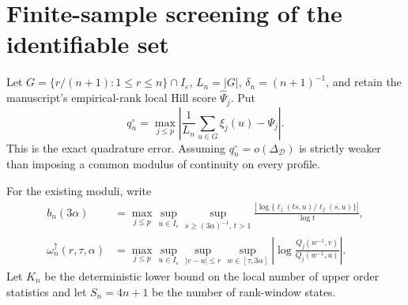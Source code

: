 \documentclass[11pt]{article}
\theoremstyle{definition}\newtheorem{definition}[theorem]{Definition}
\newcommand{\I}{I_\varepsilon}
\newcommand{\D}{\mathcal D}
\begin{document}
\section{Finite-sample screening of the identifiable set}

Let $G=\{r/(n+1):1\le r\le n\}\cap\I$, $L_n=|G|$,
$\delta_n=(n+1)^{-1}$, and retain the manuscript's empirical-rank local Hill
score $\widehat\Psi_j$.  Put
\begin{equation}
 q_n^\circ
 =\max_{j\le p}
 \left|\frac1{L_n}\sum_{u\in G}\xi_j(u)-\Psi_j\right|.
 \label{eq:direct-quadrature}
\end{equation}
This is the exact quadrature error.  Assuming $q_n^\circ=o(\Delta_{\D})$ is
strictly weaker than imposing a common modulus of continuity on every
profile.

For the existing moduli, write
\begin{align*}
 b_n(3\alpha)
 &=\max_{j\le p}\sup_{u\in\I}
   \sup_{s\ge(3\alpha)^{-1},\,t>1}
   \frac{|\log\{\ell_j(ts,u)/\ell_j(s,u)\}|}{\log t},\\
 \omega_n^\uparrow(r,\tau,\alpha)
 &=\max_{j\le p}\sup_{u\in\I}
   \sup_{|v-u|\le r}\sup_{w\in[\tau,3\alpha]}
   \left|\log\frac{Q_j(w^{-1},v)}{Q_j(w^{-1},u)}\right|.
\end{align*}
Let $K_n$ be the deterministic lower bound on the local number of upper order
statistics and let $S_n=4n+1$ be the number of rank-window states.
\end{document}
